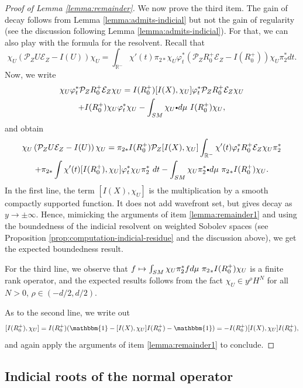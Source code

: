 \documentclass[10pt]{amsart}
\newcommand\mto{\mathchoice{\longmapsto}{\mapsto}{\mapsto}{\mapsto}}
\newcommand{\sbullet}{{\scriptscriptstyle\bullet}}
\newcommand{\csbullet}{{\raisebox{1pt}{$\sbullet$}}}
\newcommand{\R}{\mathbb{R}}
\theoremstyle{plain}
\theoremstyle{definition}
\begin{document}
\begin{proof}[Proof of Lemma \ref{lemma:remainder}]
We now prove the third item. The gain of decay follows from Lemma \ref{lemma:admits-indicial} but not the gain of regularity (see the discussion following Lemma \ref{lemma:admits-indicial}). For that, we can also play with the formula for the resolvent. Recall that
\[
\chi_U\left(\mathcal{P}_Z U \mathcal{E}_Z - I(U)\right)\chi_U = \int_{\R^-} \chi'(t)\pi_{2\ast} \chi_U\varphi_t^* \left( \mathcal{P}_Z R_0^+ \mathcal{E}_Z - I(R_0^+)\right)\chi_U \pi_2^\ast dt.
\]
Now, we write
\begin{multline*}
\chi_U\varphi_t^* \mathcal{P}_Z R_0^+ \mathcal{E}_Z \chi_U = I(R_0^+) [I(X),\chi_U]\varphi_t^* \mathcal{P}_Z R_0^+ \mathcal{E}_Z \chi_U \\
+ I(R_0^+)\chi_U \varphi_t^* \chi_U - \int_{SM}\chi_U \csbullet d\mu~ I(R_0^+)\chi_U,
\end{multline*}
and obtain
\begin{multline*}
\chi_U\left(\mathcal{P}_Z U \mathcal{E}_Z - I(U)\right)\chi_U= \pi_{2\ast}I(R_0^+) \mathcal{P}_Z [I(X),\chi_U] \int_{\R^-}\chi'(t)\varphi_t^* R_0^+ \mathcal{E}_Z\chi_U \pi_2^\ast \\
+ \pi_{2\ast} \int \chi'(t) [I(R_0^+),\chi_U] \varphi_t^*\chi_U \pi_2^\ast \ dt - \int_{SM} \chi_U \pi_2^* \csbullet d\mu~ {\pi_2}_* I(R_0^+)\chi_U.
\end{multline*}
In the first line, the term $[I(X),\chi_U]$ is the multiplication by a smooth compactly supported function. It does not add wavefront set, but gives decay as $y\to\pm\infty$. Hence, mimicking the arguments of item \eqref{lemma:remainder1} and using the boundedness of the indicial resolvent on weighted Sobolev spaces (see Proposition \ref{prop:computation-indicial-residue} and the discussion above), we get the expected boundedness result.

{\color{black}For the third line, we observe that $f \mto \int_{SM} \chi_U \pi_2^* f d\mu~ {\pi_2}_* I(R_0^+)\chi_U$ is a finite rank operator, and the expected results follows from the fact $\chi_U\in y^\rho H^N$ for all $N>0$, $\rho\in (-d/2, d/2)$. }

As to the second line, we write out
\[
[I(R_0^+), \chi_U] = I(R_0^+)(\mathbbm{1} - [I(X),\chi_U]I(R_0^+) - \mathbbm{1}) =- I(R_0^+)[I(X),\chi_U]I(R_0^+),
\]
and again apply the arguments of item \eqref{lemma:remainder1} to conclude.
\end{proof}

\subsection{Indicial roots of the normal operator}
\label{ssection:roots}
\end{document}
